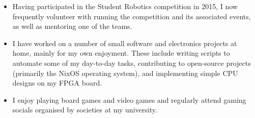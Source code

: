 
\begin{itemize}
  \item Having participated in the Student Robotics competition in 2015, I now frequently volunteer with running the competition and its associated events, as well as mentoring one of the teams.
  \item I have worked on a number of small software and electronics projects at home, mainly for my own enjoyment. These include writing scripts to automate some of my day-to-day tasks, contributing to open-source projects (primarily the NixOS operating system), and implementing simple CPU designs on my FPGA board.
  \item I enjoy playing board games and video games and regularly attend gaming socials organised by societies at my university.
\end{itemize}
